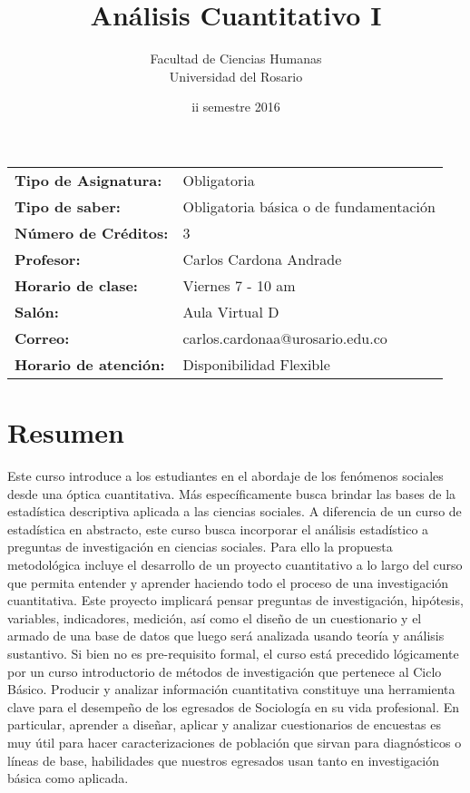 \documentclass[letterpaper]{article}
\date{\vspace{-5ex}}
\begin{document}
\title{Análisis Cuantitativo I} 
\author{Facultad de Ciencias Humanas \\
	Universidad del Rosario}
\date{{\sc ii} semestre 2016}

\maketitle

\begin{tabular}{ll}
		{\bf Tipo de Asignatura:} & Obligatoria \\
			{\bf Tipo de saber:} & Obligatoria básica o
			de fundamentación \\
					{\bf Número de Créditos:} & 3 \\
	{\bf Profesor:} & Carlos Cardona Andrade \\
	{\bf Horario de clase:} & Viernes 7 - 10 am \\
	{\bf Salón:} &  Aula Virtual D  \\
	{\bf Correo:} & carlos.cardonaa@urosario.edu.co \\
	{\bf Horario de atenci\'on:} & Disponibilidad Flexible \\
\end{tabular}

\section{Resumen}
Este curso introduce a los estudiantes en el abordaje de los fenómenos sociales desde una óptica cuantitativa. Más específicamente busca brindar las bases de la estadística descriptiva aplicada a las ciencias sociales. A diferencia de un curso de estadística en abstracto, este curso busca incorporar el análisis estadístico a preguntas de investigación en ciencias sociales. Para ello la propuesta metodológica incluye el desarrollo de un proyecto cuantitativo a lo largo del curso que permita entender y aprender haciendo todo el proceso de una investigación cuantitativa. Este proyecto implicará pensar preguntas de investigación, hipótesis, variables, indicadores, medición, así como el diseño de un cuestionario y el armado de una base de datos que luego será analizada usando teoría y análisis sustantivo. Si bien no es pre-requisito formal, el curso está precedido lógicamente por un curso introductorio de métodos de investigación que pertenece al Ciclo Básico. Producir y analizar información cuantitativa constituye una herramienta clave para el desempeño de los egresados de Sociología en su vida profesional. En particular, aprender a diseñar, aplicar y analizar cuestionarios de encuestas es muy útil para hacer caracterizaciones de población que sirvan para diagnósticos o líneas de base, habilidades que nuestros egresados usan tanto en investigación básica como aplicada. 
\end{document}
